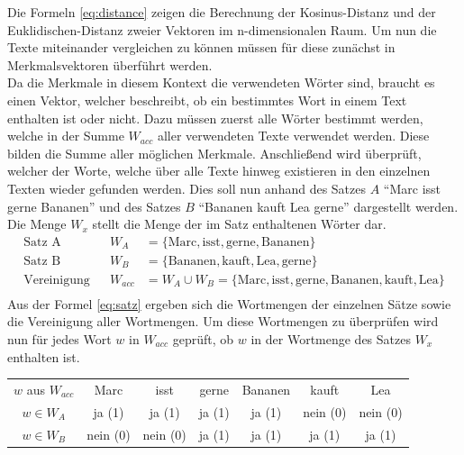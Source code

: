 Die Formeln \eqref{eq:distance} zeigen die Berechnung der Kosinus-Distanz und der Euklidischen-Distanz zweier Vektoren im n-dimensionalen Raum. Um nun die Texte miteinander vergleichen zu können müssen für diese zunächst in Merkmalsvektoren überführt werden. \\ \newline
Da die Merkmale in diesem Kontext die verwendeten Wörter sind, braucht es einen Vektor, welcher beschreibt, ob ein bestimmtes Wort in einem Text enthalten ist oder nicht. Dazu müssen zuerst alle Wörter bestimmt werden, welche in der Summe $W_{acc}$ aller verwendeten Texte verwendet werden. Diese bilden die Summe aller möglichen Merkmale. Anschließend wird überprüft, welcher der Worte, welche über alle Texte hinweg existieren in den einzelnen Texten wieder gefunden werden. Dies soll nun anhand des Satzes $A$ "`Marc isst gerne Bananen"' und des Satzes $B$ "`Bananen kauft Lea gerne"' dargestellt werden. Die Menge $W_{x}$ stellt die Menge der im Satz enthaltenen Wörter dar. 
\begin{equation}
	\begin{aligned} 
		\text{Satz A}&& W_{A}&=\{\text{Marc},\text{isst},\text{gerne},\text{Bananen}\}  \\
		\text{Satz B}&& W_{B}&=\{\text{Bananen},\text{kauft},\text{Lea},\text{gerne}\}  \\
		\text{Vereinigung}&& W_{acc} &= W_{A}\cup W_{B} = \{\text{Marc},\text{isst},\text{gerne},\text{Bananen},\text{kauft},\text{Lea}\}  \\
	\end{aligned} 
	\label{eq:satz}
\end{equation}
Aus der Formel \eqref{eq:satz} ergeben sich die Wortmengen der einzelnen Sätze sowie die Vereinigung aller Wortmengen. Um diese Wortmengen zu überprüfen wird nun für jedes Wort $w$ in $W_{acc}$ geprüft, ob $w$ in der Wortmenge des Satzes $W_{x}$ enthalten ist. 


\begin{center}
	\begin{tabular}{ c c c c c c c }
		
		$w$ aus $W_{acc}$ & Marc 	& isst 		& gerne 	& Bananen 	& kauft 	& Lea		\\
		$w\in {W}_{A}$ 	  & ja (1)	& ja (1)	& ja (1)	& ja (1)	& nein (0)	& nein (0)	\\
		$w\in {W}_{B}$ 	  & nein (0)& nein (0)	& ja (1)	& ja (1)	& ja (1)	& ja (1)
		
	\end{tabular}

\end{center}

